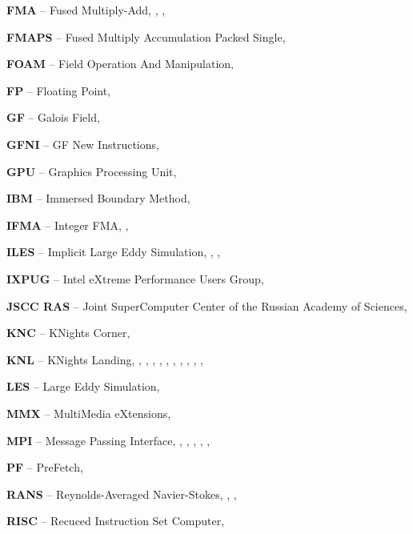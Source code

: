 \textbf{FMA} -- Fused Multiply-Add, \pageref{abbr:fma-1}, \pageref{abbr:fma-2}, \pageref{abbr:fma-3}

\textbf{FMAPS} -- Fused Multiply Accumulation Packed Single, \pageref{abbr:fmaps-1}

\textbf{FOAM} -- Field Operation And Manipulation, \pageref{abbr:foam-1}

\textbf{FP} -- Floating Point, \pageref{abbr:fp-1}

\textbf{GF} -- Galois Field, \pageref{abbr:gf-1}

\textbf{GFNI} -- GF New Instructions, \pageref{abbr:gfni-1}

\textbf{GPU} -- Graphics Processing Unit, \pageref{abbr:gpu-1}

\textbf{IBM} -- Immersed Boundary Method, \pageref{abbr:ibm-1}

\textbf{IFMA} -- Integer FMA, \pageref{abbr:ifma-1}, \pageref{abbr:ifma-2}

\textbf{ILES} -- Implicit Large Eddy Simulation, \pageref{abbr:iles-1}, \pageref{abbr:iles-2}, \pageref{abbr:iles-3}

\textbf{IXPUG} -- Intel eXtreme Performance Users Group, \pageref{abbr:ixpug-1}

\textbf{JSCC RAS} -- Joint SuperComputer Center of the Russian Academy of Sciences, \pageref{abbr:jscc-ras-1}

\textbf{KNC} -- KNights Corner, \pageref{abbr:knc-1}

\textbf{KNL} -- KNights Landing, \pageref{abbr:knl-1}, \pageref{abbr:knl-2}, \pageref{abbr:knl-3}, \pageref{abbr:knl-4}, \pageref{abbr:knl-5}, \pageref{abbr:knl-6}, \pageref{abbr:knl-7}, \pageref{abbr:knl-8}, \pageref{abbr:knl-9}, \pageref{abbr:knl-10}, \pageref{abbr:knl-11} %

\textbf{LES} -- Large Eddy Simulation, \pageref{abbr:les-1}

\textbf{MMX} -- MultiMedia eXtensions, \pageref{abbr:mmx-1}

\textbf{MPI} -- Message Passing Interface, \pageref{abbr:mpi-1}, \pageref{abbr:mpi-2}, \pageref{abbr:mpi-3}, \pageref{abbr:mpi-4}, \pageref{abbr:mpi-5}, \pageref{abbr:mpi-6}

\textbf{PF} -- PreFetch, \pageref{abbr:pf-1}

\textbf{RANS} -- Reynolds-Averaged Navier-Stokes, \pageref{abbr:rans-1}, \pageref{abbr:rans-2}, \pageref{abbr:rans-3}

\textbf{RISC} -- Recuced Instruction Set Computer, \pageref{abbr:risc-1}

